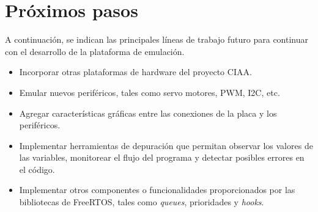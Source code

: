 \section{Próximos pasos}


A continuación, se indican las principales líneas de trabajo futuro para continuar con el desarrollo de la plataforma de emulación.

\begin{itemize}

\item Incorporar otras plataformas de hardware del proyecto CIAA.

\item Emular nuevos periféricos, tales como servo motores, PWM, I2C, etc.

\item Agregar características gráficas entre las conexiones de la placa y los periféricos.

\item Implementar herramientas de depuración que permitan observar los valores de las variables, monitorear el flujo del programa y detectar posibles errores en el código.

\item Implementar otros componentes o funcionalidades proporcionados por las bibliotecas de FreeRTOS, tales como \textit{queues}, prioridades y \textit{hooks}.

\end{itemize}